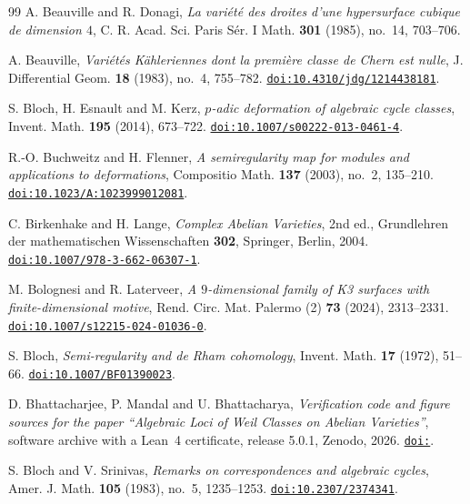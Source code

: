 \begin{thebibliography}{99}
A. Beauville and R. Donagi,
\emph{La vari\'et\'e des droites d'une hypersurface cubique de dimension
$4$},
C. R. Acad. Sci. Paris S\'er. I Math. \textbf{301} (1985), no.~14, 703--706.

A. Beauville,
\emph{Vari\'et\'es K\"ahleriennes dont la premi\`ere classe de Chern est
nulle},
J. Differential Geom. \textbf{18} (1983), no.~4, 755--782.
\href{https://doi.org/10.4310/jdg/1214438181}{\texttt{doi:10.4310/jdg/1214438181}}.

S. Bloch, H. Esnault and M. Kerz,
\emph{$p$-adic deformation of algebraic cycle classes},
Invent. Math. \textbf{195} (2014), 673--722.
\href{https://doi.org/10.1007/s00222-013-0461-4}{\texttt{doi:10.1007/s00222-013-0461-4}}.

R.-O. Buchweitz and H. Flenner,
\emph{A semiregularity map for modules and applications to deformations},
Compositio Math. \textbf{137} (2003), no.~2, 135--210.
\href{https://doi.org/10.1023/A:1023999012081}{\texttt{doi:10.1023/A:1023999012081}}.

C. Birkenhake and H. Lange,
\emph{Complex Abelian Varieties}, 2nd ed.,
Grundlehren der mathematischen Wissenschaften \textbf{302},
Springer, Berlin, 2004.
\href{https://doi.org/10.1007/978-3-662-06307-1}{\texttt{doi:10.1007/978-3-662-06307-1}}.

M. Bolognesi and R. Laterveer,
\emph{A $9$-dimensional family of K3 surfaces with finite-dimensional motive},
Rend. Circ. Mat. Palermo (2) \textbf{73} (2024), 2313--2331.
\href{https://doi.org/10.1007/s12215-024-01036-0}{\texttt{doi:10.1007/s12215-024-01036-0}}.

S. Bloch,
\emph{Semi-regularity and de Rham cohomology},
Invent. Math. \textbf{17} (1972), 51--66.
\href{https://doi.org/10.1007/BF01390023}{\texttt{doi:10.1007/BF01390023}}.

D. Bhattacharjee, P. Mandal and U. Bhattacharya,
\emph{Verification code and figure sources for the paper ``Algebraic Loci of
Weil Classes on Abelian Varieties''}, software archive with a Lean~4
certificate, release 5.0.1, Zenodo, 2026.
\href{https://doi.org/\zenodoCodeID}{\texttt{doi:\zenodoCodeID}}.

S. Bloch and V. Srinivas,
\emph{Remarks on correspondences and algebraic cycles},
Amer. J. Math. \textbf{105} (1983), no.~5, 1235--1253.
\href{https://doi.org/10.2307/2374341}{\texttt{doi:10.2307/2374341}}.


\end{thebibliography}
